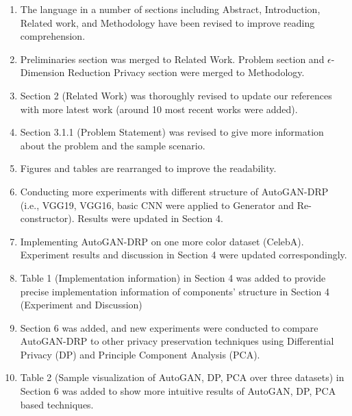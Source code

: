 \documentclass[]{elsarticle}
\begin{document}
\begin{enumerate}
	\item The language in a number of sections including Abstract, Introduction, Related work, and Methodology have been revised to improve reading comprehension. 
	
	\item Preliminaries section was merged to Related Work. Problem section and $\epsilon$-Dimension Reduction Privacy section were merged to Methodology. 
	
	\item Section 2 (Related Work) was thoroughly revised to update our references with more latest work (around 10 most recent works were added).
	
	\item Section 3.1.1 (Problem Statement) was revised to give more information about the problem and the sample scenario. 
	
	\item  Figures and tables are rearranged to improve the readability.
	
	\item Conducting more experiments with different structure of AutoGAN-DRP (i.e., VGG19, VGG16, basic CNN were applied to Generator and Re-constructor). Results were updated in Section 4.  
	
	\item Implementing AutoGAN-DRP on one more color dataset (CelebA). Experiment results and discussion in Section 4 were updated correspondingly. 
	
	\item Table 1 (Implementation information) in Section 4 was added to provide precise implementation information of components' structure in Section 4 (Experiment and Discussion)  
	
	\item Section 6 was added, and new experiments were conducted to compare AutoGAN-DRP to other privacy preservation techniques using Differential Privacy (DP) and Principle Component Analysis (PCA). 
	
	\item Table 2 (Sample visualization of AutoGAN, DP, PCA over three datasets) in Section 6 was added to show more intuitive results of AutoGAN, DP, PCA based techniques.   
\end{enumerate}
\end{document}
